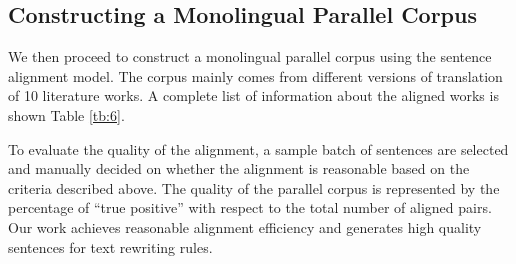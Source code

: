 \documentclass[runningheads]{llncs}
\begin{document}
\begin{spacing}{1.1}
\section{Constructing a Monolingual Parallel Corpus}\label{sec:data}

We then proceed to construct a monolingual parallel corpus using the sentence alignment model. The corpus mainly comes from different versions of translation of 10 literature works. A complete list of information about the aligned works is shown Table \ref{tb:6}.

To evaluate the quality of the alignment, a sample batch of sentences are selected and manually decided on whether the alignment is reasonable based on the criteria described above. The quality of the parallel corpus is represented by the percentage of ``true positive'' with respect to the total number of aligned pairs. Our work achieves reasonable alignment efficiency and generates high quality sentences for text rewriting rules.


\end{spacing}
\end{document}
